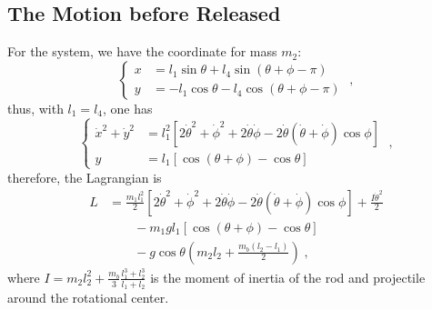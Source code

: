 \documentclass[%
reprint,
amsmath,amssymb,
aps,
]{revtex4-1}
\begin{document}
	\subsection{The Motion before Released}
	For the system, we have the coordinate for mass $m_2$:
	\begin{equation}
	\left\{
	\begin{aligned}
	x&=l_1 \sin\theta + l_4 \sin(\theta + \phi - \pi)\\
	y&=-l_1\cos\theta - l_4 \cos(\theta + \phi - \pi)
	\end{aligned}
	\right.\;,
	\end{equation}
	thus, with $l_1 = l_4$, one has
	\begin{equation}\label{xyy}
	\left\{
	\begin{aligned}
	\dot{x}^2+\dot{y}^2
	&=l_1^2 
	\left[2\dot{\theta}^2+\dot{\phi}^2+2\dot{\theta}\dot{\phi}
	-2\dot{\theta}(\dot{\theta}+\dot{\phi})\cos\phi
	\right]
	\\
	y&= l_1 \left[\cos(\theta + \phi) - \cos\theta\right]
	\end{aligned}
	\right.\;,
	\end{equation}
	therefore, the Lagrangian is
	\begin{equation}
	\begin{aligned}
	L &=
	\frac{m_1 l_1^2}{2}\left[2\dot{\theta}^2+\dot{\phi}^2+2\dot{\theta}\dot{\phi}
	-2\dot{\theta}(\dot{\theta}+\dot{\phi})\cos\phi
	\right]
	+\frac{I\dot{\theta}^2}{2}\\
	&\qquad
	-m_1gl_1\left[\cos(\theta + \phi) - \cos\theta\right]\\
	&\qquad
	-
	g\cos\theta\left(m_2l_2+\frac{m_b(l_2-l_1)}{2}\right)
	\;,
	\end{aligned}
	\end{equation}
	where $I=m_2l_2^2+\frac{m_b}{3}\frac{l_1^3+l_2^3}{l_1+l_2}$ is the moment of inertia of the rod and projectile around the rotational center. 
	
\end{document}
